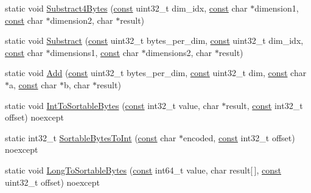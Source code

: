\begin{DoxyCompactItemize}
\item 
static void \mbox{\hyperlink{classlucene_1_1core_1_1util_1_1numeric_1_1NumericUtils_adc8172d03864cf97fc6a266fdb425773}{Substract4\+Bytes}} (\mbox{\hyperlink{ZlibCrc32_8h_a2c212835823e3c54a8ab6d95c652660e}{const}} uint32\+\_\+t dim\+\_\+idx, \mbox{\hyperlink{ZlibCrc32_8h_a2c212835823e3c54a8ab6d95c652660e}{const}} char $\ast$dimension1, \mbox{\hyperlink{ZlibCrc32_8h_a2c212835823e3c54a8ab6d95c652660e}{const}} char $\ast$dimension2, char $\ast$result)
\item 
static void \mbox{\hyperlink{classlucene_1_1core_1_1util_1_1numeric_1_1NumericUtils_a95837a28f8cd7df6f0f2dee82fb3563f}{Substract}} (\mbox{\hyperlink{ZlibCrc32_8h_a2c212835823e3c54a8ab6d95c652660e}{const}} uint32\+\_\+t bytes\+\_\+per\+\_\+dim, \mbox{\hyperlink{ZlibCrc32_8h_a2c212835823e3c54a8ab6d95c652660e}{const}} uint32\+\_\+t dim\+\_\+idx, \mbox{\hyperlink{ZlibCrc32_8h_a2c212835823e3c54a8ab6d95c652660e}{const}} char $\ast$dimensions1, \mbox{\hyperlink{ZlibCrc32_8h_a2c212835823e3c54a8ab6d95c652660e}{const}} char $\ast$dimensions2, char $\ast$result)
\item 
static void \mbox{\hyperlink{classlucene_1_1core_1_1util_1_1numeric_1_1NumericUtils_af46b1eb966d5889c7944e479c7d58cda}{Add}} (\mbox{\hyperlink{ZlibCrc32_8h_a2c212835823e3c54a8ab6d95c652660e}{const}} uint32\+\_\+t bytes\+\_\+per\+\_\+dim, \mbox{\hyperlink{ZlibCrc32_8h_a2c212835823e3c54a8ab6d95c652660e}{const}} uint32\+\_\+t dim, \mbox{\hyperlink{ZlibCrc32_8h_a2c212835823e3c54a8ab6d95c652660e}{const}} char $\ast$a, \mbox{\hyperlink{ZlibCrc32_8h_a2c212835823e3c54a8ab6d95c652660e}{const}} char $\ast$b, char $\ast$result)
\item 
static void \mbox{\hyperlink{classlucene_1_1core_1_1util_1_1numeric_1_1NumericUtils_a14068e73ee0e5807916069ca9d1a6717}{Int\+To\+Sortable\+Bytes}} (\mbox{\hyperlink{ZlibCrc32_8h_a2c212835823e3c54a8ab6d95c652660e}{const}} int32\+\_\+t value, char $\ast$result, \mbox{\hyperlink{ZlibCrc32_8h_a2c212835823e3c54a8ab6d95c652660e}{const}} int32\+\_\+t offset) noexcept
\item 
static int32\+\_\+t \mbox{\hyperlink{classlucene_1_1core_1_1util_1_1numeric_1_1NumericUtils_ab4e64bb2562706735963406bade7d4c5}{Sortable\+Bytes\+To\+Int}} (\mbox{\hyperlink{ZlibCrc32_8h_a2c212835823e3c54a8ab6d95c652660e}{const}} char $\ast$encoded, \mbox{\hyperlink{ZlibCrc32_8h_a2c212835823e3c54a8ab6d95c652660e}{const}} int32\+\_\+t offset) noexcept
\item 
static void \mbox{\hyperlink{classlucene_1_1core_1_1util_1_1numeric_1_1NumericUtils_a10725e2cbea0ae91ccf373396b9b97ae}{Long\+To\+Sortable\+Bytes}} (\mbox{\hyperlink{ZlibCrc32_8h_a2c212835823e3c54a8ab6d95c652660e}{const}} int64\+\_\+t value, char result\mbox{[}$\,$\mbox{]}, \mbox{\hyperlink{ZlibCrc32_8h_a2c212835823e3c54a8ab6d95c652660e}{const}} uint32\+\_\+t offset) noexcept

\end{DoxyCompactItemize}
